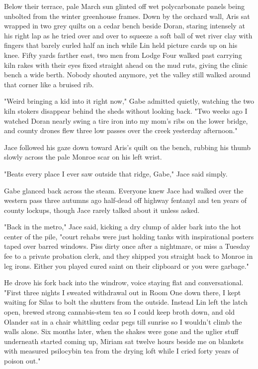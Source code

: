Below their terrace, pale March sun glinted off wet polycarbonate panels being unbolted from the winter greenhouse frames. Down by the orchard wall, Aris sat wrapped in two grey quilts on a cedar bench beside Doran, staring intensely at his right lap as he tried over and over to squeeze a soft ball of wet river clay with fingers that barely curled half an inch while Lin held picture cards up on his knee. Fifty yards farther east, two men from Lodge Four walked past carrying kiln rakes with their eyes fixed straight ahead on the mud ruts, giving the clinic bench a wide berth. Nobody shouted anymore, yet the valley still walked around that corner like a bruised rib.

"Weird bringing a kid into it right now," Gabe admitted quietly, watching the two kiln stokers disappear behind the sheds without looking back. "Two weeks ago I watched Doran nearly swing a tire iron into my mom's ribs on the lower bridge, and county drones flew three low passes over the creek yesterday afternoon."

Jace followed his gaze down toward Aris's quilt on the bench, rubbing his thumb slowly across the pale Monroe scar on his left wrist.

"Beats every place I ever saw outside that ridge, Gabe," Jace said simply.

Gabe glanced back across the steam. Everyone knew Jace had walked over the western pass three autumns ago half-dead off highway fentanyl and ten years of county lockups, though Jace rarely talked about it unless asked.

"Back in the metro," Jace said, kicking a dry clump of alder bark into the hot center of the pile, "court rehabs were just holding tanks with inspirational posters taped over barred windows. Piss dirty once after a nightmare, or miss a Tuesday fee to a private probation clerk, and they shipped you straight back to Monroe in leg irons. Either you played cured saint on their clipboard or you were garbage."

He drove his fork back into the windrow, voice staying flat and conversational. "First three nights I sweated withdrawal out in Room One down there, I kept waiting for Silas to bolt the shutters from the outside. Instead Lin left the latch open, brewed strong cannabis-stem tea so I could keep broth down, and old Olander sat in a chair whittling cedar pegs till sunrise so I wouldn't climb the walls alone. Six months later, when the shakes were gone and the uglier stuff underneath started coming up, Miriam sat twelve hours beside me on blankets with measured psilocybin tea from the drying loft while I cried forty years of poison out."

